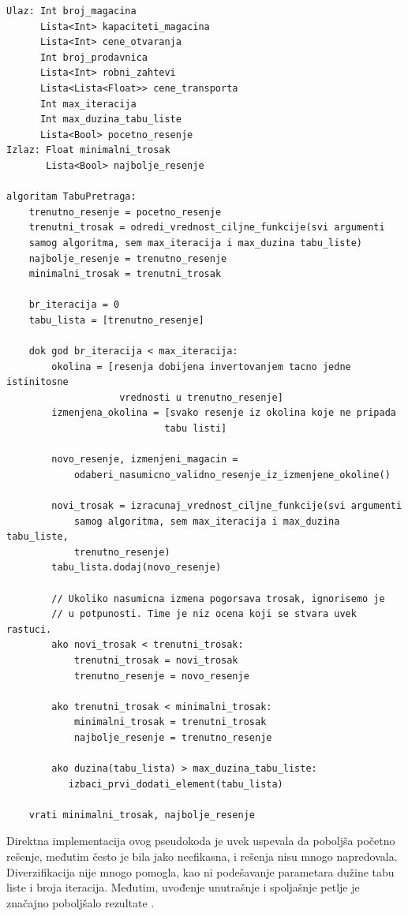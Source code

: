 \documentclass[a4paper]{article}
\begin{document}
\begin{lstlisting}
Ulaz: Int broj_magacina
      Lista<Int> kapaciteti_magacina
      Lista<Int> cene_otvaranja
      Int broj_prodavnica
      Lista<Int> robni_zahtevi
      Lista<Lista<Float>> cene_transporta
      Int max_iteracija
      Int max_duzina_tabu_liste
      Lista<Bool> pocetno_resenje
Izlaz: Float minimalni_trosak
       Lista<Bool> najbolje_resenje

algoritam TabuPretraga:
    trenutno_resenje = pocetno_resenje
    trenutni_trosak = odredi_vrednost_ciljne_funkcije(svi argumenti
    samog algoritma, sem max_iteracija i max_duzina tabu_liste)
    najbolje_resenje = trenutno_resenje
    minimalni_trosak = trenutni_trosak
    
    br_iteracija = 0
    tabu_lista = [trenutno_resenje]
    
    dok god br_iteracija < max_iteracija:
        okolina = [resenja dobijena invertovanjem tacno jedne istinitosne
                    vrednosti u trenutno_resenje]
        izmenjena_okolina = [svako resenje iz okolina koje ne pripada 
                            tabu listi]
        
        novo_resenje, izmenjeni_magacin =
            odaberi_nasumicno_validno_resenje_iz_izmenjene_okoline()
        
        novi_trosak = izracunaj_vrednost_ciljne_funkcije(svi argumenti
            samog algoritma, sem max_iteracija i max_duzina tabu_liste,
            trenutno_resenje)
        tabu_lista.dodaj(novo_resenje)
        
        // Ukoliko nasumicna izmena pogorsava trosak, ignorisemo je
        // u potpunosti. Time je niz ocena koji se stvara uvek rastuci.
        ako novi_trosak < trenutni_trosak:
            trenutni_trosak = novi_trosak
            trenutno_resenje = novo_resenje
        
        ako trenutni_trosak < minimalni_trosak:
            minimalni_trosak = trenutni_trosak
            najbolje_resenje = trenutno_resenje
        
        ako duzina(tabu_lista) > max_duzina_tabu_liste:
           izbaci_prvi_dodati_element(tabu_lista)
            
    vrati minimalni_trosak, najbolje_resenje
\end{lstlisting}

Direktna implementacija ovog pseudokoda je uvek uspevala da poboljša početno rešenje, međutim često je bila jako neefikasna, i rešenja nisu mnogo napredovala. Diverzifikacija nije mnogo pomogla, kao ni podešavanje parametara dužine tabu liste i broja iteracija. Međutim, uvođenje unutrašnje i spoljašnje petlje je značajno poboljšalo rezultate \cite{loops}. 
\end{document}
